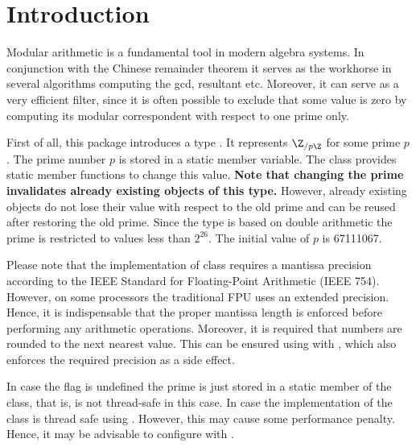 \cleardoublepage
{}



\section{Introduction}

Modular arithmetic is a fundamental tool in modern algebra systems. 
In conjunction with the Chinese remainder theorem it serves as the 
workhorse in several algorithms computing the gcd, resultant etc. 
Moreover, it can serve as a very efficient filter, since it is often 
possible to exclude that some value is zero by computing its modular 
correspondent with respect to one prime only. 

First of all, this package introduces a type .
It represents $\Z_{/p\Z}$ for some prime $p$. 
The prime number $p$ is stored in a static member variable. 
The class provides static member functions to change this value. 
{\bf Note that changing the prime invalidates already existing objects 
of this type.}
However, already existing objects do not lose their value with respect to the 
old prime and can be reused after restoring the old prime. 
Since the type is based on double 
arithmetic the prime is restricted to values less than $2^{26}$. 
The initial value of $p$ is 67111067. 

Please note that the implementation of class  requires a mantissa 
precision according to the IEEE Standard for Floating-Point Arithmetic (IEEE 754). 
However, on some processors the traditional FPU uses an extended precision. Hence, it 
is  indispensable that the proper mantissa length is enforced before performing 
any arithmetic operations. Moreover, it is required that numbers are rounded to the 
next nearest value. This can be ensured using  with 
, which also enforces the required precision as a side effect. 

\begin{ccAdvanced}      
In case the flag  
is undefined the prime is just stored in a static member 
of the class, that is,  is not thread-safe in this case.  
In case 
the implementation of the class is thread safe using 
. However, this may cause some performance 
penalty. Hence, it may be advisable to configure  with 
. 
\end{ccAdvanced} 


